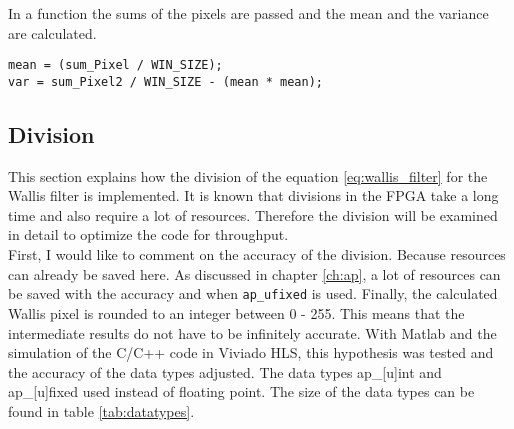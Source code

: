 In a function the sums of the pixels are passed and the mean and the variance are calculated. \\
\begin{minipage}{\textwidth}
\begin{lstlisting}[style=CStyle, caption=Calculation of the mean and variance, label=lst:mean_var]
mean = (sum_Pixel / WIN_SIZE);
var = sum_Pixel2 / WIN_SIZE - (mean * mean);
\end{lstlisting}
\end{minipage}


\subsection{Division} \label{ch:hls:div}
This section explains how the division of the equation \ref{eq:wallis_filter} for the Wallis filter is implemented. It is known that divisions in the FPGA take a long time and also require a lot of resources. Therefore the division will be examined in detail to optimize the code for throughput. \\
First, I would like to comment on the accuracy of the division. Because
resources can already be saved here. As discussed in chapter \ref{ch:ap}, a lot
of resources can be saved with the accuracy and when \texttt{ap\_ufixed} is used.
Finally, the calculated Wallis pixel is rounded to an integer between 0 - 255. This means that the intermediate results do not have to be infinitely accurate. With Matlab and the simulation of the C/C++ code in Viviado HLS, this hypothesis was tested and the accuracy of the data types adjusted. The data types ap\_[u]int and ap\_[u]fixed used instead of floating point. The size of the data types can be found in table \ref{tab:datatypes}. 

